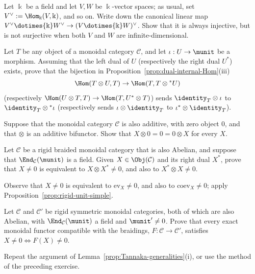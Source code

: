 
\begin{Exercises}
	\item Let $\Bbbk$ be a field and let $V,W$ be $\Bbbk$-vector spaces; as usual, set $V^\vee:=\Hom_{\Bbbk}(V,\Bbbk)$, and so on. Write down the canonical linear map
	$V^\vee\dotimes{\Bbbk}W^\vee\to(V\dotimes{\Bbbk}W)^\vee$.
	Show that it is always injective, but is not surjective when both $V$ and $W$ are infinite-dimensional.

	\item Let $T$ be any object of a monoidal category $\mathcal{C}$, and let $\iota:U\to\munit$ be a morphism. Assuming that the left dual of $U$ (respectively the right dual $U^*$) exists, prove that the bijection in Proposition~\ref{prop:dual-internal-Hom}(iii)
	\[ \Hom(T\otimes U,T)\to\Hom(T,T\otimes{}^*U) \]
	(respectively $\Hom(U\otimes T,T)\to\Hom(T,U^*\otimes T)$) sends $\identity_T\otimes\iota$ to $\identity_T\otimes{}^*\iota$ (respectively sends $\iota\otimes\identity_T$ to $\iota^*\otimes\identity_T$).

	\item Suppose that the monoidal category $\mathcal{C}$ is also additive, with zero object $0$, and that $\otimes$ is an additive bifunctor. Show that $X\otimes0=0=0\otimes X$ for every $X$.

	\item Let $\mathcal{C}$ be a rigid braided monoidal category that is also Abelian, and suppose that $\End_{\mathcal{C}}(\munit)$ is a field. Given $X\in\Obj(\mathcal{C})$ and its right dual $X^*$, prove that $X\neq0$ is equivalent to $X\otimes X^*\neq0$, and also to $X^*\otimes X\neq0$.
	\begin{hint}
		Observe that $X\neq0$ is equivalent to $\mathrm{ev}_X\neq0$, and also to $\mathrm{coev}_X\neq0$; apply Proposition~\ref{prop:rigid-unit-simple}.
	\end{hint}

	\item Let $\mathcal{C}$ and $\mathcal{C}'$ be rigid symmetric monoidal categories, both of which are also Abelian, with $\End_{\mathcal{C}}(\munit)$ a field and $\munit'\neq0$. Prove that every exact monoidal functor compatible with the braidings,
	$F:\mathcal{C}\to\mathcal{C}'$, satisfies $X\neq0\iff F(X)\neq0$.
	\begin{hint}
		Repeat the argument of Lemma~\ref{prop:Tannaka-generalities}(i), or use the method of the preceding exercise.
	\end{hint}


\end{Exercises}
